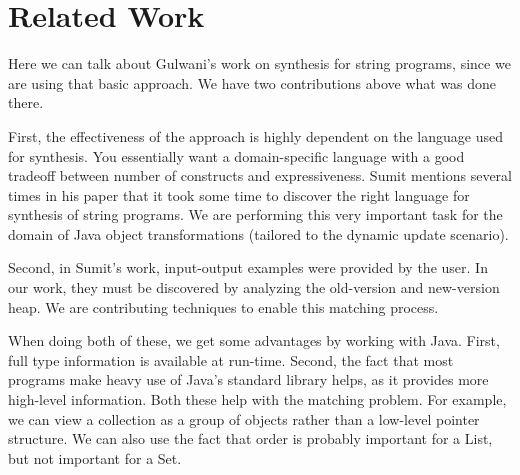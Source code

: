 \section{Related Work}

Here we can talk about Gulwani's work on synthesis for string
programs, since we are using that basic approach.  We have two
contributions above what was done there.

First, the effectiveness of the approach is highly dependent on the
language used for synthesis.  You essentially want a domain-specific
language with a good tradeoff between number of constructs and
expressiveness.  Sumit mentions several times in his paper that it
took some time to discover the right language for synthesis of string
programs.  We are performing this very important task for the domain
of Java object transformations (tailored to the dynamic update
scenario).

Second, in Sumit's work, input-output examples were provided by the
user.  In our work, they must be discovered by analyzing the
old-version and new-version heap.  We are contributing techniques to
enable this matching process.

When doing both of these, we get some advantages by working with Java.
First, full type information is available at run-time.  Second, the
fact that most programs make heavy use of Java's standard library
helps, as it provides more high-level information.  Both these help
with the matching problem.  For example, we can view a collection as a
group of objects rather than a low-level pointer structure.  We can
also use the fact that order is probably important for a List, but not
important for a Set.


